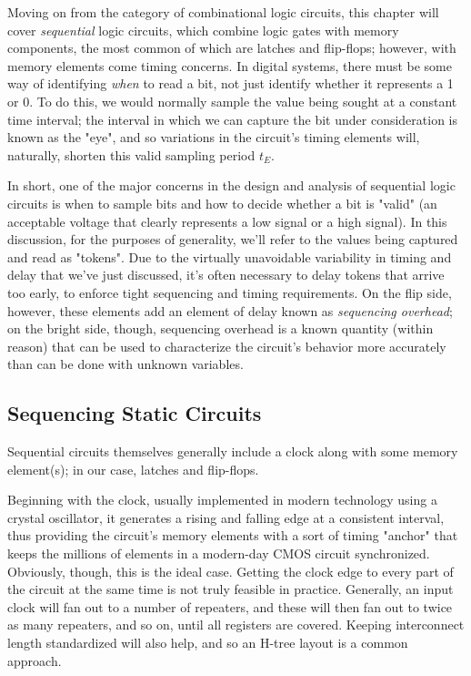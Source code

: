 \documentclass{article}
\begin{document}
Moving on from the category of combinational logic circuits, this chapter will cover \textit{sequential} logic circuits, which combine logic gates with memory components, the most common of which are latches and flip-flops; however, with memory elements come timing concerns. In digital systems, there must be some way of identifying \textit{when} to read a bit, not just identify whether it represents a 1 or 0. To do this, we would normally sample the value being sought at a constant time interval; the interval in which we can capture the bit under consideration is known as the "eye", and so variations in the circuit's timing elements will, naturally, shorten this valid sampling period \(t_E\).

In short, one of the major concerns in the design and analysis of sequential logic circuits is when to sample bits and how to decide whether a bit is "valid" (an acceptable voltage that clearly represents a low signal or a high signal). In this discussion, for the purposes of generality, we'll refer to the values being captured and read as "tokens". Due to the virtually unavoidable variability in timing and delay that we've just discussed, it's often necessary to delay tokens that arrive too early, to enforce tight sequencing and timing requirements. On the flip side, however, these elements add an element of delay known as \textit{sequencing overhead}; on the bright side, though, sequencing overhead is a known quantity (within reason) that can be used to characterize the circuit's behavior more accurately than can be done with unknown variables.

\subsection{Sequencing Static Circuits}

Sequential circuits themselves generally include a clock along with some memory element(s); in our case, latches and flip-flops.

Beginning with the clock, usually implemented in modern technology using a crystal oscillator, it generates a rising and falling edge at a consistent interval, thus providing the circuit's memory elements with a sort of timing "anchor" that keeps the millions of elements in a modern-day CMOS circuit synchronized. Obviously, though, this is the ideal case. Getting the clock edge to every part of the circuit at the same time is not truly feasible in practice. Generally, an input clock will fan out to a number of repeaters, and these will then fan out to twice as many repeaters, and so on, until all registers are covered. Keeping interconnect length standardized will also help, and so an H-tree layout is a common approach.
\end{document}
